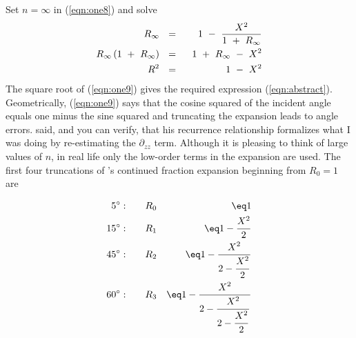 Set $ n=\infty $ in (\ref{eqn:one8}) and solve
\begin{eqnarray}
R_{\infty} \ \  &=& \ \  1 \ -\  { X^2   \over  1 \ +\  R_{\infty} }
\nonumber
\\
R_{\infty} \, ( 1 \ +\  R_{\infty} )
        \ \  &=&  \ \  1 \ +\  R_{\infty} \ -\  X^2
\nonumber
\\
R^2 \ \  &=&  \ \  1 \ -\  X^2
\label{eqn:one9}
\end{eqnarray}
The square root of (\ref{eqn:one9})
gives the required expression (\ref{eqn:abstract}).
Geometrically, (\ref{eqn:one9}) says that the cosine squared of the incident
angle equals one minus the sine squared and
truncating the expansion leads to angle errors.
 said,
and you can verify,
that his recurrence relationship formalizes
what I was doing
by re-estimating the $\partial_{zz}$ term.
Although it is pleasing to think of large values of $n$,
in real life
only the low-order terms in the expansion are used.
The first four truncations of 's continued fraction expansion
beginning from $R_0 = 1$ are

\begin{eqnarray}
 \label{eqn:oldtab2}
 5^\circ : \quad\quad & R_0 &\eq  1 \\       
15^\circ : \quad\quad & R_1 &\eq  1 -\displaystyle {\strut X^2\over 2}
                        \nonumber \\
45^\circ : \quad\quad & R_2 &\eq  1 -{\displaystyle{\strut X^2}\over
                     \displaystyle 2 - {\strut X^2\over 2}}
                     \nonumber \\
60^\circ : \quad\quad & R_3 &\eq  1 - {\displaystyle {\strut X^2}
                    \over\displaystyle 2 - {\strut X^2 \over
             \displaystyle 2 - {\strut X^2\over 2}}} 
                        \nonumber
\end{eqnarray}


